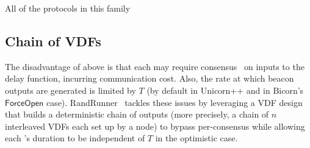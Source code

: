 All of the protocols in this family

\subsection{Chain of VDFs}
\label{subsection:randrunner}
The disadvantage of above is that each \epoch may require consensus~\cite{castro1999practical} on inputs to the delay function, incurring communication cost.
Also, the rate at which beacon outputs are generated is limited by $T$ (by default in Unicorn++ and in Bicorn's $\mathsf{ForceOpen}$ case).
RandRunner~\cite{schindler2021randrunner} tackles these issues by leveraging a VDF design that builds a deterministic chain of outputs (more precisely, a chain of $n$ interleaved VDFs each set up by a node) to bypass per-\epoch consensus while allowing each \epoch's duration to be independent of $T$ in the optimistic case.


